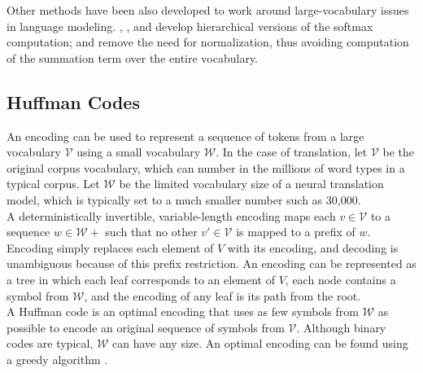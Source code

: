 Other methods have been also developed to work around large-vocabulary issues in
language modeling. , ,
and  develop hierarchical versions of
the softmax computation; 
and  remove the need for normalization,
thus avoiding computation of the summation term over the entire vocabulary.

\subsection{Huffman Codes}

An encoding can be used to represent a sequence of tokens from a large
vocabulary $\mathcal{V}$ using a small vocabulary $\mathcal{W}$. In the case of
translation, let $\mathcal{V}$ be the original corpus vocabulary, which can
number in the millions of word types in a typical corpus. Let $\mathcal{W}$ be
the limited vocabulary size of a neural translation model, which is typically
set to a much smaller number such as 30,000.\\

A deterministically invertible, variable-length encoding maps each
$v\in\mathcal{V}$ to a sequence $w \in \mathcal{W}+$ such that no other
$v'\in\mathcal{V}$ is mapped to a prefix of $w$. Encoding simply replaces each
element of $V$ with its encoding, and decoding is unambiguous because of this
prefix restriction. An encoding can be represented as a tree in which each leaf
corresponds to an element of $V$, each node contains a symbol from
$\mathcal{W}$, and the encoding of any leaf is its path from the root.\\

A Huffman code is an optimal encoding that uses as few symbols from
$\mathcal{W}$ as possible to encode an original sequence of symbols from
$\mathcal{V}$. Although binary codes are typical, $\mathcal{W}$ can have any
size. An optimal encoding can be found using a greedy algorithm
\cite{huffman}.\\
